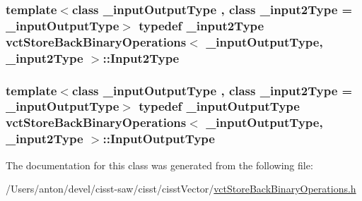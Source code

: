 \subsubsection[{Input2\+Type}]{\setlength{\rightskip}{0pt plus 5cm}template$<$class \+\_\+input\+Output\+Type , class \+\_\+input2\+Type  = \+\_\+input\+Output\+Type$>$ typedef \+\_\+input2\+Type {\bf vct\+Store\+Back\+Binary\+Operations}$<$ \+\_\+input\+Output\+Type, \+\_\+input2\+Type $>$\+::{\bf Input2\+Type}}\label{classvct_store_back_binary_operations_a65a7197563c794a879fb50a406e70c8f}
\hypertarget{classvct_store_back_binary_operations_a9dc481d9e1345541dd5d833d5e5688f3}{}
\subsubsection[{Input\+Output\+Type}]{\setlength{\rightskip}{0pt plus 5cm}template$<$class \+\_\+input\+Output\+Type , class \+\_\+input2\+Type  = \+\_\+input\+Output\+Type$>$ typedef \+\_\+input\+Output\+Type {\bf vct\+Store\+Back\+Binary\+Operations}$<$ \+\_\+input\+Output\+Type, \+\_\+input2\+Type $>$\+::{\bf Input\+Output\+Type}}\label{classvct_store_back_binary_operations_a9dc481d9e1345541dd5d833d5e5688f3}


The documentation for this class was generated from the following file\+:\begin{DoxyCompactItemize}
\item 
/\+Users/anton/devel/cisst-\/saw/cisst/cisst\+Vector/\hyperlink{vct_store_back_binary_operations_8h}{vct\+Store\+Back\+Binary\+Operations.\+h}\end{DoxyCompactItemize}
